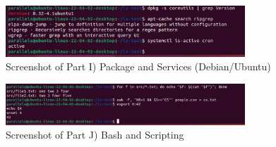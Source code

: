 \begin{figure}[h!]
    \centering
    \includegraphics[width=0.8\textwidth]{linuxptI.png}
    \caption{Screenshot of Part I) Package and Services (Debian/Ubuntu)}
    \label{fig:problemsetI}
\end{figure}

\begin{figure}[h!]
    \centering
    \includegraphics[width=0.8\textwidth]{linuxptJ.png}
    \caption{Screenshot of Part J) Bash and Scripting}
    \label{fig:problemsetJ}
\end{figure}
